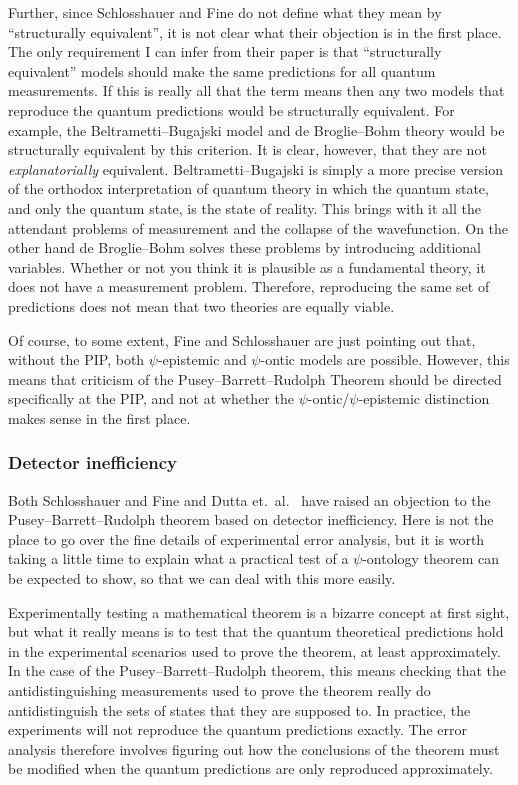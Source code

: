 \documentclass[DIV=calc,fontsize=12pt]{scrartcl} %
\theoremstyle{definition}
\theoremstyle{plain}
\begin{document}
Further, since Schlosshauer and Fine do not define what they mean by
``structurally equivalent'', it is not clear what their objection is
in the first place.  The only requirement I can infer from their paper
is that ``structurally equivalent'' models should make the same
predictions for all quantum measurements.  If this is really all that
the term means then any two models that reproduce the quantum
predictions would be structurally equivalent.  For example, the
Beltrametti--Bugajski model and de Broglie--Bohm theory would be
structurally equivalent by this criterion.  It is clear, however, that
they are not \emph{explanatorially} equivalent.  Beltrametti--Bugajski
is simply a more precise version of the orthodox interpretation of
quantum theory in which the quantum state, and only the quantum state,
is the state of reality.  This brings with it all the attendant
problems of measurement and the collapse of the wavefunction.  On the
other hand de Broglie--Bohm solves these problems by introducing
additional variables.  Whether or not you think it is plausible as a
fundamental theory, it does not have a measurement problem.
Therefore, reproducing the same set of predictions does not mean that
two theories are equally viable.

Of course, to some extent, Fine and Schlosshauer are just pointing out
that, without the PIP, both $\psi$-epistemic and $\psi$-ontic models
are possible.  However, this means that criticism of the Pusey--Barrett--Rudolph Theorem
should be directed specifically at the PIP, and not at whether the
$\psi$-ontic/$\psi$-epistemic distinction makes sense in the first
place.

\subsubsection{Detector inefficiency}

\label{Crit:SF2}

Both Schlosshauer and Fine \cite{Schlosshauer2012} and Dutta et.\ al.\
\cite{Dutta2014} have raised an objection to the Pusey--Barrett--Rudolph theorem based on
detector inefficiency.  Here is not the place to go over the fine
details of experimental error analysis, but it is worth taking a
little time to explain what a practical test of a $\psi$-ontology
theorem can be expected to show, so that we can deal with this more
easily.

Experimentally testing a mathematical theorem is a bizarre concept at
first sight, but what it really means is to test that the quantum
theoretical predictions hold in the experimental scenarios used to
prove the theorem, at least approximately.  In the case of the Pusey--Barrett--Rudolph
theorem, this means checking that the antidistinguishing measurements
used to prove the theorem really do antidistinguish the sets of states
that they are supposed to.  In practice, the experiments will not
reproduce the quantum predictions exactly.  The error analysis
therefore involves figuring out how the conclusions of the theorem
must be modified when the quantum predictions are only reproduced
approximately.
\end{document}
